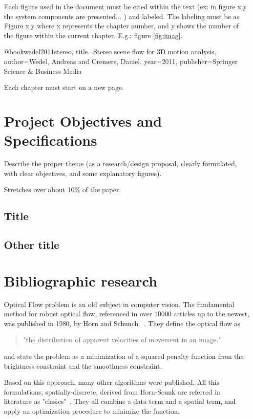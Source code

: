 \documentclass[12pt,a4paper,twoside]{report}
\begin{document}
Each figure used in the document must be cited within the text (ex: in figure x.y the system components are presented... ) and labeled. The labeling must be as Figure x.y where x represents the chapter number, and y shows the number of the figure within the current chapter. 
 E.g.: figure \ref{fig:imag}.

@book{wedel2011stereo,
	title={Stereo scene flow for 3D motion analysis},
	author={Wedel, Andreas and Cremers, Daniel},
	year={2011},
	publisher={Springer Science \& Business Media}
}

Each chapter must start on a new page.

\chapter{Project Objectives and Specifications}


Describe the proper theme (as a research/design proposal, clearly formulated, with clear objectives, and some explanatory figures).

Stretches over about 10\% of the paper.

\section{Title}
\section{Other title}

\chapter{Bibliographic research}


{\color{red}{must be about 9 pages}}

Optical Flow problem is an old subject in computer vision. The fundamental method for robust optical flow, referenced in over $10000$ articles up to the newest, was published in 1980, by Horn and Schunch ~\cite{HSOpticalFlow}. They define the optical flow as
\begin{quote}
"the distribution of apparent velocities of movement in an image."
\end{quote}
and state the problem as a minimization of a squared penalty function from the brightness constraint and the smoothness constraint.

Based on this approach, many other algorithms were published. All this formulations, spatially-discrete, derived from Horn-Scunk are referred in literature as "clasics"~\cite{sun2010,QAnalysis}. They all combine a data term and a spatial term, and apply an optimization procedure to minimize the function. 
\end{document}
